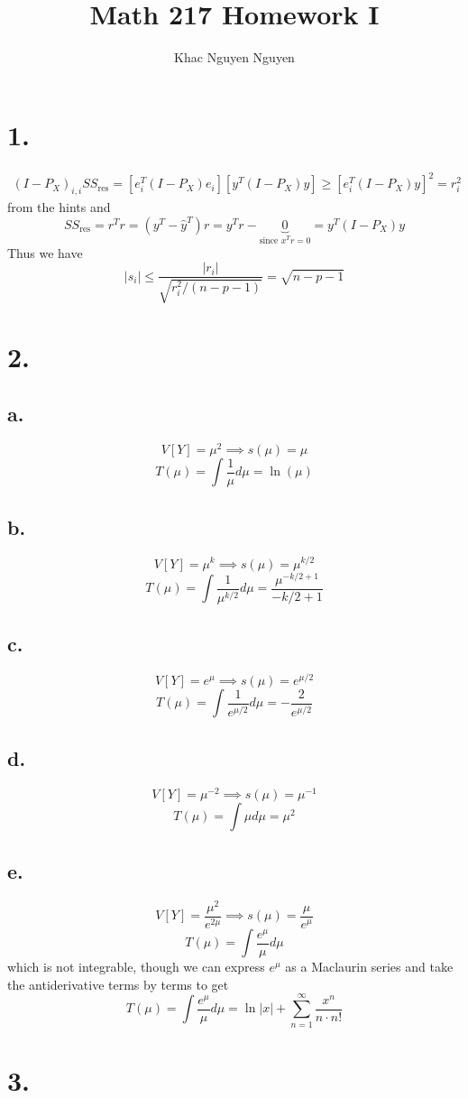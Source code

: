 \documentclass[11pt]{article}
\title{\textbf{Math 217 Homework I}}
\author{Khac Nguyen Nguyen}
\date{}
\theoremstyle{mystyle}
\theoremstyle{definition}
\begin{document}
\section*{1.}
\begin{align*}
  (I-P_X)_{i,i} SS_{\text{res}} = [e_i^T (I-P_X) e_i] [y^T (I-P_X)y] \ge [e_i^T(I-P_X)y]^2 = r^2_i
\end{align*}
from the hints and
\[
  SS_{\text{res}} = r^T r = (y^T - \hat y^T) r = y^T r - \underbrace{0}_{\text{since } x^T r = 0} = y^T(I-P_X)y
\]
Thus we have 
\[
  |s_i| \le \displaystyle\frac{|r_i|}{\sqrt{r_i^2/(n-p-1)}} = \sqrt{n-p-1}
\]
\clearpage
\section*{2.}
\subsection*{a.}
\[
  V[Y] = \mu^2 \implies s(\mu) = \mu
\]
\[
  T(\mu) = \int \displaystyle\frac{1}{\mu} d\mu = \ln(\mu)
\]
\subsection*{b.}
\[
  V[Y] = \mu^k \implies s(\mu) = \mu^{k/2}
\]
\[
  T(\mu) = \int \displaystyle\frac{1}{\mu^{k/2}} d\mu = \frac{\mu^{-k/2 + 1}}{-k/2 + 1}
\]
\subsection*{c.}
\[
  V[Y] =e^\mu \implies s(\mu) = e^{\mu/2}
\]
\[
  T(\mu) = \int \displaystyle\frac{1}{e^{\mu/2}} d\mu = -\displaystyle\frac{2}{e^{\mu/2}}
\]
\subsection*{d.}
\[
  V[Y] = \mu^{-2} \implies s(\mu) = \mu^{-1}
\]
\[
  T(\mu) = \int \mu d\mu = \mu^2
\]
\subsection*{e.}
\[
  V[Y] = \displaystyle\frac{\mu^2}{e^{2\mu}} \implies s(\mu) = \displaystyle\frac{\mu}{e^\mu}
\]
\[
  T(\mu) = \int \displaystyle\frac{e^\mu}{\mu} d\mu 
\]
which is not integrable, though we can express $e^\mu$ as a Maclaurin series and take the antiderivative terms by terms to get 
\[
  T(\mu) = \int \displaystyle\frac{e^\mu}{\mu} d\mu =\ln|x| + \sum_{n=1}^\infty \displaystyle\frac{x^n}{n \cdot n!}
\]
\clearpage
\section*{3.}
\end{document}
